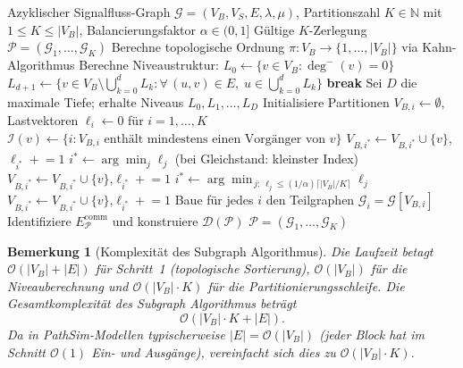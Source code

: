 ﻿\documentclass[12pt,a4paper]{article}
\newtheorem{bemerkung}[theorem]{Bemerkung}
\theoremstyle{definition}
\begin{document}
\begin{algorithm}[H]
\caption{Subgraph Algorithmus}
\label{alg:subgraph}
\begin{algorithmic}[1]
\Require Azyklischer Signalfluss-Graph $\mathcal{G} = (V_B, V_S, E, \lambda, \mu)$,
         Partitionszahl $K \in \mathbb{N}$ mit $1 \leq K \leq |V_B|$,
         Balancierungsfaktor $\alpha \in (0, 1]$
\Ensure  Gültige $K$-Zerlegung $\mathcal{P} = (\mathcal{G}_1, \ldots, \mathcal{G}_K)$
\State Berechne topologische Ordnung $\pi : V_B \to \{1, \ldots, |V_B|\}$
       via Kahn-Algorithmus
\State Berechne Niveaustruktur: $L_0 \gets \{v \in V_B : \deg^-(v) = 0\}$
  \State $L_{d+1} \gets \bigl\{v \in V_B \setminus \bigcup_{k=0}^d L_k :
         \forall\,(u,v) \in E,\; u \in \bigcup_{k=0}^d L_k\bigr\}$
   \textbf{break} \EndIf
\EndFor
\State Sei $D$ die maximale Tiefe; erhalte Niveaus $L_0, L_1, \ldots, L_D$
\State Initialisiere Partitionen $V_{B,i} \gets \emptyset$,
       Lastvektoren $\ell_i \gets 0$ für $i = 1, \ldots, K$
  \State $\mathcal{I}(v) \gets \{i : V_{B,i} \text{ enthält mindestens einen
         Vorgänger von } v\}$
      \State $V_{B,i^*} \gets V_{B,i^*} \cup \{v\}$,\quad $\ell_{i^*} \mathrel{+}= 1$
    \Else
      \State $i^* \gets \arg\min_j \ell_j$ (bei Gleichstand: kleinster Index)
      \State $V_{B,i^*} \gets V_{B,i^*} \cup \{v\}$,\quad $\ell_{i^*} \mathrel{+}= 1$
    \EndIf
  \Else
    \State $i^* \gets \arg\min_{\,j :\, \ell_j \leq (1/\alpha)\lceil|V_B|/K\rceil} \ell_j$
    \State $V_{B,i^*} \gets V_{B,i^*} \cup \{v\}$,\quad $\ell_{i^*} \mathrel{+}= 1$
  \EndIf
\EndFor
\State Baue für jedes $i$ den Teilgraphen $\mathcal{G}_i = \mathcal{G}[V_{B,i}]$
\State Identifiziere $E_{\mathcal{P}}^{\mathrm{comm}}$ und
       konstruiere $\mathcal{D}(\mathcal{P})$
\State \Return $\mathcal{P} = (\mathcal{G}_1, \ldots, \mathcal{G}_K)$
\end{algorithmic}
\end{algorithm}

\begin{bemerkung}[Komplexität des Subgraph Algorithmus]
\label{bem:complexity}
Die Laufzeit betagt $\mathcal{O}(|V_B| + |E|)$ für Schritt~1 (topologische
Sortierung), $\mathcal{O}(|V_B|)$ für die Niveauberechnung und
$\mathcal{O}(|V_B| \cdot K)$ für die Partitionierungsschleife.
Die Gesamtkomplexität des Subgraph Algorithmus beträgt
\[
  \mathcal{O}(|V_B| \cdot K + |E|).
\]
Da in PathSim-Modellen typischerweise $|E| = \mathcal{O}(|V_B|)$
(jeder Block hat im Schnitt $\mathcal{O}(1)$ Ein- und Ausgänge), vereinfacht
sich dies zu $\mathcal{O}(|V_B| \cdot K)$.
\end{bemerkung}
\end{document}
